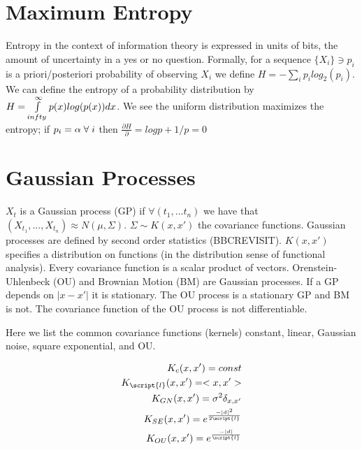\section{Maximum Entropy}
Entropy in the context of information theory is expressed in units of bits, the amount of uncertainty in a yes or no question. Formally, for a sequence $ \{X_i\} \ni p_i  $ is a priori/posteriori probability of observing $X_i$ we define $H=- \sum\limits_{i} p_i log_2( p_i) $.  We can define the entropy of a probability distribution by $H=\int\limits_{\-infty}^{\infty} p(x) log( p(x) ) dx $.  We see the uniform distribution maximizes the entropy; if $p_i=\alpha \; \forall \; i$ then $\frac{\partial H}{\partial } = log p +1/p=0 $

\section{Gaussian Processes}
$X_t$ is a Gaussian process (GP) if $\forall (t_1,...t_n)$ we have that $(X_{t_1}, ... ,X_{t_n}) \approx N(\mu, \Sigma)$. $\Sigma \sim K(x,x')$ the covariance functions.  Gaussian processes are defined by second order statistics (BBCREVISIT). $K(x,x')$ specifies a distribution on functions (in the distribution sense of functional analysis). Every covariance function is a scalar product of vectors.  Orenstein-Uhlenbeck (OU) and Brownian Motion (BM) are Gaussian processes. If a GP depends on $|x-x'|$ it is stationary.  The OU process is a stationary GP and BM is not. The covariance function of the OU process is not differentiable.

Here we list the common covariance functions (kernels) constant, linear, Gaussian noise, square exponential, and OU.
\begin{center}\begin{eqnarray*}
K_c(x,x')= const \\
K_\script{l}(x,x') = <x,x'> \\
K_{GN}(x,x') = \sigma^2 \delta_{x,x'} \\
K_{SE}(x,x') = e^{ \frac{-|d|^2}{2 \script{l}} }\\
K_{OU}(x,x') = e^{ \frac{-|d|}{\script{l}} }
\end{eqnarray*}\end{center}
 